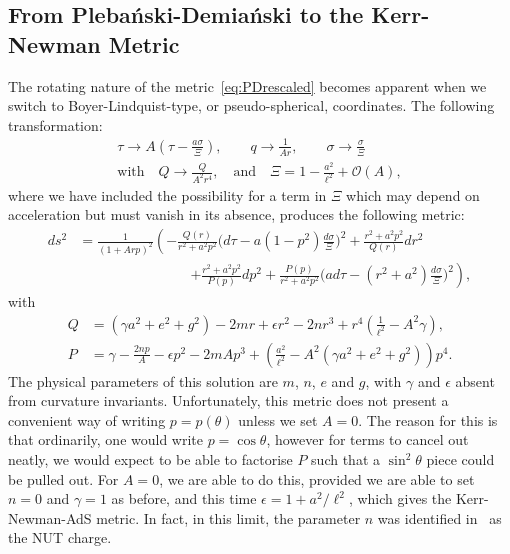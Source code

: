 \documentclass[
twoside,
openright,
frontopenright
]{dmathesis}
\newcommand{\nn}{\nonumber}
\newcommand{\PD}{Pleba\'nski-Demia\'nski}
\begin{document}
\subsection{From \PD{} to the Kerr-Newman Metric}
\label{sec:PDtoKN}

The rotating nature of the metric~\eqref{eq:PDrescaled} becomes apparent when we
switch to Boyer-Lindquist-type, or pseudo-spherical, coordinates. The following
transformation:
\begin{gather}
  \tau\to A\left(\tau-\frac{a\sigma}{\Xi}\right), \qquad q \to \frac{1}{Ar},
  \qquad \sigma \to \frac{\sigma}{\Xi}\\
  \mbox{with} \quad Q\to
  \frac{Q}{A^2r^4}, \quad \mbox{and} \quad
  \Xi=1-\frac{a^2}{\ell^2}+\mathcal{O}(A),
  \label{eq:PDtoBL}
\end{gather}
where we have included the possibility for a term in $\Xi$ which may depend on
acceleration but must vanish in its absence, produces the following metric:
\begin{align}
  ds^2 &= \frac{1}{(1+Arp)^2}\left( -\frac{Q(r)}{r^2+a^2p^2}\Big(d\tau -
         a(1-p^2) \frac{d\sigma}{\Xi} \Big)^2 + \frac{r^2+a^2p^2}{Q(r)}dr^2
         \right.\nn\\
  &\hspace{8em} \left. + \frac{r^2+a^2p^2}{P(p)}dp^2
  + \frac{P(p)}{r^2+a^2p^2} \Big(ad\tau-(r^2+a^2)
    \frac{d\sigma}{\Xi}\Big)^2\right),
\end{align}
with
\begin{align}
  \label{eq:PDfnrescaledKN}
  Q &= (\gamma a^2+e^2 + g^2) - 2mr + \epsilon r^2 - 2nr^3 + r^4\left(\frac{1}{\ell^2} 
      - A^2\gamma\right),\nn\\ 
  P &=  \gamma - \frac{2np}{A} - \epsilon p^2 -
      2mAp^3 + \left(\frac{a^2}{\ell^2} - A^2(\gamma a^2+e^2+g^2)\right)p^4.
\end{align}
The physical parameters of this solution are $m$, $n$, $e$ and $g$, with
$\gamma$ and $\epsilon$ absent from curvature invariants. Unfortunately, this
metric does not present a convenient way of writing $p=p(\theta)$ unless we set
$A=0$. The reason for this is that ordinarily, one would write $p=\cos{\theta}$,
however for terms to cancel out neatly, we would expect to be able to factorise
$P$ such that a $\sin^2\theta$ piece could be pulled out. For $A=0$, we are able
to do this, provided we are able to set $n=0$ and $\gamma=1$ as before, and this
time $\epsilon=1 + a^2/\ell^2$, which gives the Kerr-Newman-AdS metric. In fact,
in this limit, the parameter $n$ was identified in~\cite{Plebanski:1976gy} as
the NUT charge.
\end{document}
